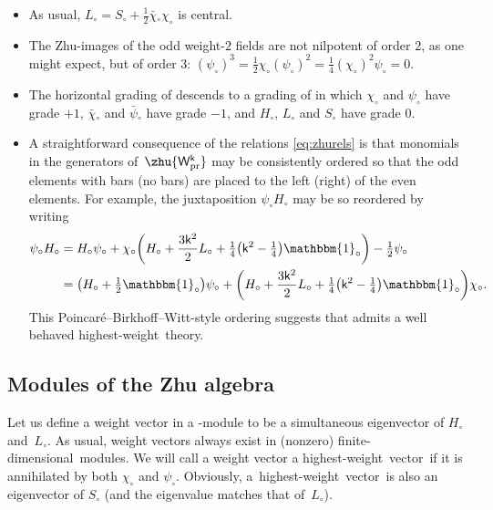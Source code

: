 \documentclass[pdftex]{sigma}
\numberwithin{equation}{section}
\newcommand{\wun}{\mathbbm{1}} %
\newcommand{\bchi}{\bar{\chi}{}} %
\newcommand{\bpsi}{\bar{\psi}{}} %
\newcommand{\kk}{\mathsf{k}} %
\DeclarePairedDelimiter{\brac}{\lparen}{\rparen} %
\newcommand{\VOA}[1]{\mathsf{#1}} %
\newcommand{\uwalg}[2]{\VOA{W}^{#1}_{\mathrm{#2}}} %
\newcommand{\upr}[1][\kk]{\uwalg{#1}{pr}} %
\newcommand{\zh}[1]{#1_{\circ}} %
\newcommand{\pbw}{Poincar\'{e}--Birkhoff--Witt}
\newcommand{\fdim}{finite-dimensional}
\newcommand{\hw}{highest-weight}
\newcommand{\hwv}{\hw\ vector}
\begin{document}
\begin{itemize}\itemsep=0pt
	\item As usual, $\zh{L} = \zh{S} + \frac{1}{2} \zh{\bchi}\zh{\chi}$ is central.
	\item The Zhu-images of the odd weight-$2$ fields are not nilpotent of order $2$, as one might expect, but of order $3$:
$(\zh{\psi})^3 = \frac{1}{2} \zh{\chi}(\zh{\psi})^2 = \frac{1}{4} (\zh{\chi})^2\zh{\psi} = 0$.
	\item The horizontal grading of \smash{$\upr$} descends to a grading of \smash{$\zhu{\upr}$} in which $\zh{\chi}$ and $\zh{\psi}$ have grade $+1$, $\zh{\bchi}$ and $\zh{\bpsi}$ have grade $-1$, and $\zh{H}$, $\zh{L}$ and $\zh{S}$ have grade $0$.
	\item A straightforward consequence of the relations \eqref{eq:zhurels} is that monomials in the generators of~$\zhu{\upr}$ may be consistently ordered so that the odd elements with bars (no bars) are placed to the left (right) of the even elements.
	For example, the juxtaposition $\zh{\psi} \zh{H}$ may be so reordered by writing
	\begin{align*}
			\zh{\psi} \zh{H}
			&= \zh{H}\zh{\psi} + \zh{\chi}\brac[\bigg]{\zh{H}+\frac{3\kk^2}{2}\zh{L}+\tfrac{1}{4}\bigl(\kk^2-\tfrac{1}{4}\bigr)\zh{\wun}} - \tfrac{1}{2}\zh{\psi} \\
			&= \bigl(\zh{H} + \tfrac{1}{2}\zh{\wun}\bigr) \zh{\psi} + \brac[\bigg]{\zh{H}+\frac{3\kk^2}{2}\zh{L}+\tfrac{1}{4}\bigl(\kk^2-\tfrac{1}{4}\bigr)\zh{\wun}} \zh{\chi}.
	\end{align*}
	This \pbw-style ordering suggests that \smash{$\zhu{\upr}$} admits a well behaved \hw\ theory.
\end{itemize}

\subsection{Modules of the Zhu algebra} \label{sec:zhuwt}

Let us define a weight vector in a \smash{$\zhu{\upr}$}-module to be a simultaneous eigenvector of $\zh{H}$ and~$\zh{L}$.
As usual, weight vectors always exist in (nonzero) \fdim\ modules.
We will call a weight vector a \hwv\ if it is annihilated by both $\zh{\chi}$ and $\zh{\psi}$.
Obviously, a~\hwv\ is also an eigenvector of $\zh{S}$ (and the eigenvalue matches that of~$\zh{L}$).
\end{document}
